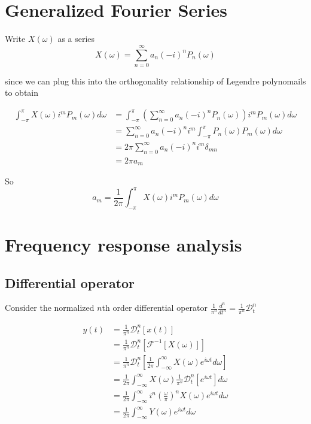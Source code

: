 \documentclass[11pt]{article}
\theoremstyle{plain}
\theoremstyle{definition}
\theoremstyle{remark}
\begin{document}
\section{Generalized Fourier Series}

Write $X(\omega)$ as a series
\begin{equation*}
	X(\omega) = \sum_{n=0}^{\infty} a_n (-i)^n P_n(\omega)
\end{equation*}

since we can plug this into the orthogonality relationship of Legendre polynomails to obtain

\begin{align*}
	\int_{-\pi}^{\pi} X(\omega) i^m P_m(\omega) d\omega 
		&= \int_{-\pi}^{\pi} \left ( \sum_{n=0}^{\infty} a_n (-i)^n P_n(\omega) \right ) i^m P_m(\omega) d\omega \\
		&= \sum_{n=0}^{\infty} a_n (-i)^n  i^m \int_{-\pi}^{\pi} P_n(\omega) P_m(\omega) d\omega \\
		&= 2 \pi \sum_{n=0}^{\infty} a_n (-i)^n  i^m \delta_{mn} \\
		&= 2 \pi a_m
\end{align*}

So
\begin{equation*}
	a_m = \frac{1}{2\pi} \int_{-\pi}^{\pi} X(\omega) i^m P_m(\omega) d\omega 
\end{equation*}

\section{Frequency response analysis}

\subsection{Differential operator}

Consider the normalized $n$th order differential operator $\frac{1}{\pi^n} \frac{d^n}{dt^n} = 
\frac{1}{\pi^n} \mathcal{D}_t^n$

\begin{align*}
	y(t) &= \frac{1}{\pi^n} \mathcal{D}_t^n[x(t)] \\
			 &= \frac{1}{\pi^n} \mathcal{D}_t^n[\mathcal{F}^{-1}[X(\omega)]] \\
			 &= \frac{1}{\pi^n} \mathcal{D}_t^n \left [ \frac{1}{2 \pi} \int_{-\infty}^{\infty} X(\omega) e^{i \omega t} d\omega \right ] \\
			 &= \frac{1}{2 \pi} \int_{-\infty}^{\infty} X(\omega) \frac{1}{\pi^n} \mathcal{D}_t^n[e^{i \omega t}] d\omega \\
			 &= \frac{1}{2 \pi} \int_{-\infty}^{\infty} i^n \left(\frac{\omega}{\pi}\right)^n X(\omega) e^{i\omega t} d\omega \\
			 &= \frac{1}{2 \pi} \int_{-\infty}^{\infty} Y(\omega) e^{i\omega t} d\omega
\end{align*}
\end{document}
